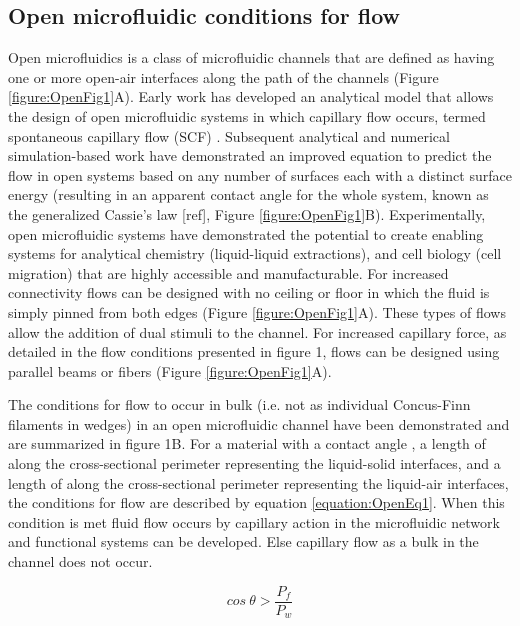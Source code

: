 \subsection{Open microfluidic conditions for flow}
Open microfluidics is a class of microfluidic channels that are defined as having one or more open-air interfaces along the path of the channels (Figure \ref{figure:OpenFig1}A). Early work has developed an analytical model that allows the design of open microfluidic systems in which capillary flow occurs, termed spontaneous capillary flow (SCF) \cite{Casavant2013}. Subsequent analytical and numerical simulation-based work have demonstrated an improved equation to predict the flow in open systems based on any number of surfaces each with a distinct surface energy (resulting in an apparent contact angle for the whole system, known as the generalized Cassie’s law [ref], Figure \ref{figure:OpenFig1}B). Experimentally, open microfluidic systems have demonstrated the potential to create enabling systems for analytical chemistry (liquid-liquid extractions)\cite{Barkal2016}, and cell biology (cell migration) that are highly accessible and manufacturable. For increased connectivity flows can be designed with no ceiling or floor in which the fluid is simply pinned from both edges (Figure \ref{figure:OpenFig1}A). These types of flows allow the addition of dual stimuli to the channel. For increased capillary force, as detailed in the flow conditions presented in figure 1, flows can be designed using parallel beams or fibers (Figure \ref{figure:OpenFig1}A).

The conditions for flow to occur in bulk (i.e. not as individual Concus-Finn filaments in wedges) in an open microfluidic channel have been demonstrated \cite{Casavant2013} and are summarized in figure 1B. For a material with a contact angle , a length of   along the cross-sectional perimeter representing the liquid-solid interfaces, and a length of  along the cross-sectional perimeter representing the liquid-air interfaces, the conditions for flow are described by equation \ref{equation:OpenEq1}. When this condition is met fluid flow occurs by capillary action in the microfluidic network and functional systems can be developed. Else capillary flow as a bulk in the channel does not occur. 

\begin{equation}
    cos\ \theta> \frac{P_f}{P_w}
    \label{equation:OpenEq1}
\end{equation}

